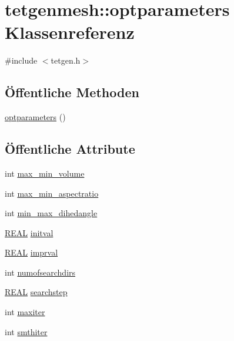 \hypertarget{classtetgenmesh_1_1optparameters}{\section{tetgenmesh\-:\-:optparameters Klassenreferenz}
\label{classtetgenmesh_1_1optparameters}
}


{\ttfamily \#include $<$tetgen.\-h$>$}

\subsection*{Öffentliche Methoden}
\begin{DoxyCompactItemize}
\item 
\hyperlink{classtetgenmesh_1_1optparameters_a06ae553af1e16ec6e9495d3e04dd53bb}{optparameters} ()
\end{DoxyCompactItemize}
\subsection*{Öffentliche Attribute}
\begin{DoxyCompactItemize}
\item 
int \hyperlink{classtetgenmesh_1_1optparameters_ac9adc44bb0076f3b2e5c11c0bf831278}{max\-\_\-min\-\_\-volume}
\item 
int \hyperlink{classtetgenmesh_1_1optparameters_a844aa0c436ff6021d3c1f7132584faa6}{max\-\_\-min\-\_\-aspectratio}
\item 
int \hyperlink{classtetgenmesh_1_1optparameters_ab391511f633b84180d0e6cc52510e343}{min\-\_\-max\-\_\-dihedangle}
\item 
\hyperlink{tetgen_8h_a4b654506f18b8bfd61ad2a29a7e38c25}{R\-E\-A\-L} \hyperlink{classtetgenmesh_1_1optparameters_a06ad962f12e69b344f409f6e835d27ec}{initval}
\item 
\hyperlink{tetgen_8h_a4b654506f18b8bfd61ad2a29a7e38c25}{R\-E\-A\-L} \hyperlink{classtetgenmesh_1_1optparameters_a5415643a8bf717ea781e97d56d725173}{imprval}
\item 
int \hyperlink{classtetgenmesh_1_1optparameters_af6ea36aeb4f65aa694e3df5c6dcd3a8d}{numofsearchdirs}
\item 
\hyperlink{tetgen_8h_a4b654506f18b8bfd61ad2a29a7e38c25}{R\-E\-A\-L} \hyperlink{classtetgenmesh_1_1optparameters_ace9dd689b3cb7b135573b46fbf6afed2}{searchstep}
\item 
int \hyperlink{classtetgenmesh_1_1optparameters_a0f2b3bd97f2120bdb77acb9e89026196}{maxiter}
\item 
int \hyperlink{classtetgenmesh_1_1optparameters_a7c01e6bed6c1f6188f7408f84b9644d9}{smthiter}
\end{DoxyCompactItemize}


